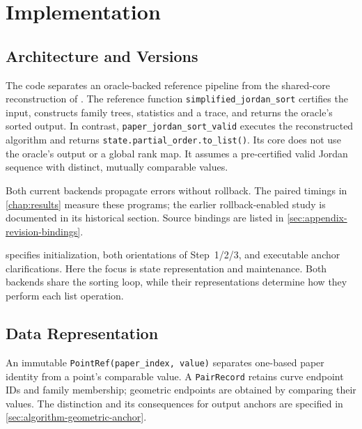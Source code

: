 \chapter{Implementation}
\label{chap:implementation}


\section{Architecture and Versions}
\label{sec:implementation-scope}
\label{sec:implementation-versions}

The code separates an oracle-backed reference pipeline from the shared-core
reconstruction of \textcite{fung1990simplified}. The reference function
\texttt{simplified\_jordan\_sort} certifies the input, constructs family trees,
statistics and a trace, and returns the oracle's sorted output. In contrast,
\texttt{paper\_jordan\_sort\_valid} executes the reconstructed algorithm and
returns \texttt{state.partial\_order.to\_list()}. Its core does not use the
oracle's output or a global rank map. It assumes a pre-certified valid Jordan
sequence with distinct, mutually comparable values.

Both current backends propagate errors without rollback. The paired timings
in \cref{chap:results} measure these programs; the earlier rollback-enabled
study is documented in its historical section. Source bindings are listed in
\cref{sec:appendix-revision-bindings}.

 specifies initialization, both orientations of
Step~1/2/3, and executable anchor clarifications. Here the focus is state
representation and maintenance. Both backends share the sorting loop, while
their representations determine how they perform each list operation.

\section{Data Representation}
\label{sec:implementation-input-model}
\label{sec:implementation-state}

An immutable \texttt{PointRef(paper\_index, value)} separates one-based paper
identity from a point's comparable value. A \texttt{PairRecord} retains curve
endpoint IDs and family membership; geometric endpoints are obtained by
comparing their values. The distinction and its consequences for output
anchors are specified in \cref{sec:algorithm-geometric-anchor}.

